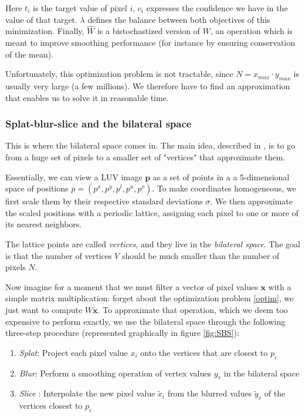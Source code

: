 \documentclass{article}
\begin{document}
Here $t_i$ is the target value of pixel $i$, $c_i$ expresses the confidence we have in the value of that target. $\lambda$ defines the balance between both objectives of this minimization.
Finally, $\hat{W}$ is a bistochastized version of $W$, an operation which is meant to improve smoothing performance (for instance by ensuring conservation of the mean).

\medskip

Unfortunately, this optimization problem is not tractable, since $N = x_{max} \cdot y_{max}$ is usually very large (a few millions). We therefore have to find an approximation that enables us to solve it in reasonable time.

\subsubsection{Splat-blur-slice and the bilateral space}

This is where the bilateral space comes in. The main idea, described in \cite{barron_fast_2015}, is to go from a huge set of pixels to a smaller set of "vertices" that approximate them. 

\medskip

Essentially, we can view a LUV image $\textbf{p}$ as a set of points in a a 5-dimensional space of positions $p = (p^x, p^y, p^l, p^u, p^v)$. To make coordinates homogeneous, we first scale them by their respective standard deviations $\sigma$. We then approximate the scaled positions with a periodic lattice, assigning each pixel to one or more of its nearest neighbors.

The lattice points are called \textit{vertices}, and they live in the \textit{bilateral space}. The goal is that the number of vertices $V$ should be much smaller than the number of pixels $N$.

\medskip

Now imagine for a moment that we must filter a vector of pixel values $\textbf{x}$ with a simple matrix multiplication: forget about the optimization problem \eqref{optim}, we just want to compute $W\textbf{x}$.
To approximate that operation, which we deem too expensive to perform exactly, we use the bilateral space through the following three-step procedure (represented graphically in figure \ref{fig:SBS}):
\begin{enumerate}
    \item \textit{Splat}: Project each pixel value $x_i$ onto the vertices that are closest to $p_i$
    \item \textit{Blur}: Perform a smoothing operation of vertex values $y_v$ in the bilateral space
    \item \textit{Slice} : Interpolate the new pixel value $\tilde{x}_i$ from the blurred values $\tilde{y}_v$ of the vertices closest to $p_i$
\end{enumerate}
\end{document}
